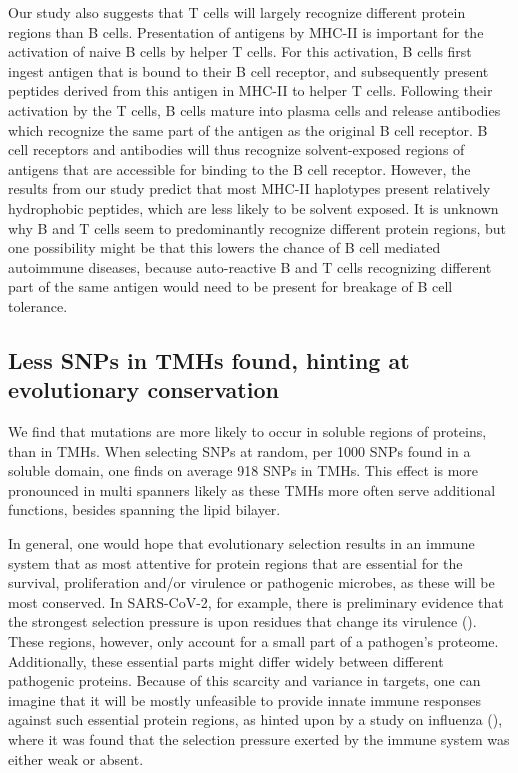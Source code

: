 Our study also suggests that T cells will largely recognize 
different protein regions than B cells. 
Presentation of antigens by MHC-II is important 
for the activation of naive B cells by helper T cells. 
For this activation, 
B cells first ingest antigen that is bound to their B cell receptor, 
and subsequently present peptides derived from this antigen in MHC-II 
to helper T cells. 
Following their activation by the T cells, 
B cells mature into plasma cells 
and release antibodies which recognize the same part of the antigen 
as the original B cell receptor. 
B cell receptors and antibodies will thus recognize solvent-exposed regions 
of antigens that are accessible for binding to the B cell receptor. 
However, the results from our study predict that most MHC-II haplotypes 
present relatively hydrophobic peptides, 
which are less likely to be solvent exposed. 
It is unknown why B and T cells seem to predominantly recognize 
different protein regions, but one possibility might be that 
this lowers the chance of B cell mediated autoimmune diseases, 
because auto-reactive B and T cells recognizing different part 
of the same antigen would need to be present for breakage of B cell tolerance. 

\subsection{Less SNPs in TMHs found, hinting at evolutionary conservation}

We find that mutations are more likely to occur
in soluble regions of proteins, than in TMHs.
When selecting SNPs at random, per 1000 SNPs found in a soluble domain, 
one finds on average 918 SNPs in TMHs.
This effect is more pronounced in multi spanners likely as these TMHs more often serve additional functions, besides spanning the lipid bilayer. 

 
In general, one would hope that evolutionary selection results in
an immune system that as most attentive for protein regions that are
essential for the survival, proliferation and/or virulence or pathogenic microbes, as these will be most conserved.
In SARS-CoV-2, for example, there is preliminary evidence that the strongest
selection pressure is upon residues that change its 
virulence (\cite{velazquez2020positive}).
These regions, however, only account for a small part of a pathogen's proteome.
Additionally, these essential parts might differ widely between different pathogenic proteins.
Because of this scarcity and variance in targets, 
one can imagine that it will be mostly unfeasible to provide innate immune responses against such essential protein regions, 
as hinted upon by a study on influenza (\cite{han2019individual}),
where it was found that the selection pressure
exerted by the immune system was either weak or absent.
 
